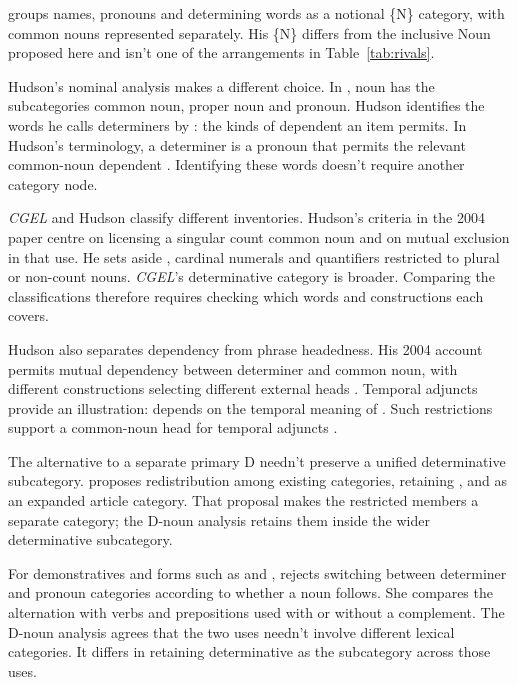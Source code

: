 \documentclass[12pt]{article}
\begin{document}
\textcite{anderson1997notional} groups names, pronouns and determining words as a notional \{N\} category, with common nouns represented separately. His \{N\} differs from the inclusive Noun proposed here and isn't one of the arrangements in Table~\ref{tab:rivals}.

Hudson's nominal analysis makes a different choice. In \textcite[253--254]{hudson2010wordgrammar}, noun has the subcategories common noun, proper noun and pronoun. Hudson identifies the words he calls determiners by : the kinds of dependent an item permits. In Hudson's terminology, a determiner is a pronoun that permits the relevant common-noun dependent \citep[9--10]{hudson2004determiners}. Identifying these words doesn't require another category node.

\textit{CGEL} and Hudson classify different inventories. Hudson's criteria in the 2004 paper centre on licensing a singular count common noun and on mutual exclusion in that use. He sets aside , cardinal numerals and quantifiers restricted to plural or non-count nouns. \textit{CGEL}'s determinative category is broader. Comparing the classifications therefore requires checking which words and constructions each covers.

Hudson also separates dependency from phrase headedness. His 2004 account permits mutual dependency between determiner and common noun, with different constructions selecting different external heads \citep[7--9]{hudson2004determiners}. Temporal adjuncts provide an illustration:  depends on the temporal meaning of . Such restrictions support a common-noun head for temporal adjuncts \citep[10--12]{hudson2004determiners}.

The alternative to a separate primary D needn't preserve a unified determinative subcategory. \textcite{spinillo2004reconceptualising} proposes redistribution among existing categories, retaining ,  and  as an expanded article category. That proposal makes the restricted members a separate category; the D-noun analysis retains them inside the wider determinative subcategory.

For demonstratives and forms such as  and , \textcite[140--144]{spinillo2004reconceptualising} rejects switching between determiner and pronoun categories according to whether a noun follows. She compares the alternation with verbs and prepositions used with or without a complement. The D-noun analysis agrees that the two uses needn't involve different lexical categories. It differs in retaining determinative as the subcategory across those uses.
\end{document}
